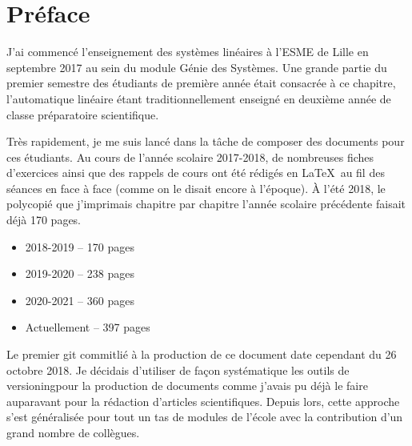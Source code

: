 \chapter*{Préface}
\thispagestyle{plain}
J'ai commencé l'enseignement des systèmes linéaires 
à l'ESME de Lille en septembre 2017 au sein du module \og Génie des Systèmes\fg.
Une grande partie du premier semestre des étudiants de première année
était consacrée à ce chapitre, l'automatique linéaire étant traditionnellement
enseigné en deuxième année de classe préparatoire scientifique.

Très rapidement, je me suis lancé dans la tâche
de composer des documents pour ces étudiants.
Au cours de l'année scolaire 2017-2018, de nombreuses fiches
d'exercices ainsi que des rappels de cours ont été rédigés en \LaTeX~au
fil des séances en face à face (comme on le disait encore à l'époque). 
À l'été 2018, le polycopié que j'imprimais
chapitre par chapitre l'année scolaire précédente faisait déjà 170 pages.
\begin{itemize}
    \item 2018-2019 -- 170 pages
    \item 2019-2020 -- 238 pages
    \item 2020-2021 -- 360 pages
    \item Actuellement -- 397 pages
\end{itemize}
Le premier \og git commit\fg lié à la production de ce document date
cependant du 26 octobre 2018. Je décidais d'utiliser de façon systématique
les outils de \og versioning\fg pour la production de documents
comme j'avais pu déjà le faire auparavant pour la rédaction
d'articles scientifiques. Depuis lors, cette approche s'est 
généralisée pour tout un tas de modules de l'école avec la contribution 
d'un grand nombre de collègues.
\newline


